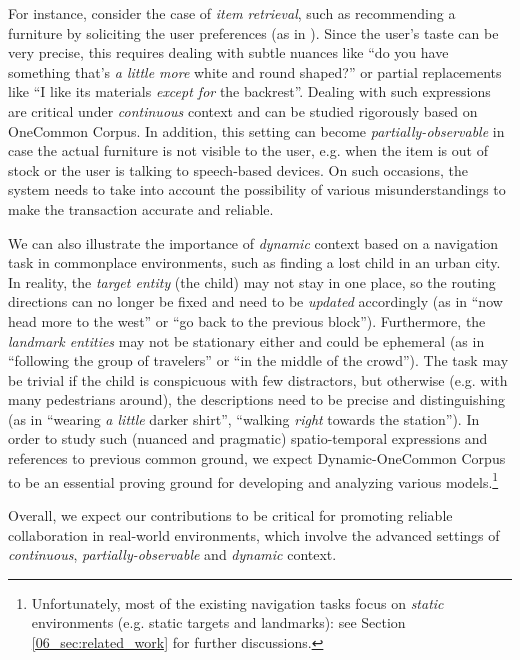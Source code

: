 For instance, consider the case of \textit{item retrieval}, such as recommending a furniture by soliciting the user preferences (as in \citealp{moon-etal-2020-situated}). Since the user's taste can be very precise, this requires dealing with subtle nuances like ``do you have something that's \textit{a little more} white and round shaped?'' or partial replacements like ``I like its materials \textit{except for} the backrest''. Dealing with such expressions are critical under \textit{continuous} context and can be studied rigorously based on OneCommon Corpus. In addition, this setting can become \textit{partially-observable} in case the actual furniture is not visible to the user, e.g. when the item is out of stock or the user is talking to speech-based devices. On such occasions, the system needs to take into account the possibility of various misunderstandings to make the transaction accurate and reliable.

We can also illustrate the importance of \textit{dynamic} context based on a navigation task in commonplace environments, such as finding a lost child in an urban city. In reality, the \textit{target entity} (the child) may not stay in one place, so the routing directions can no longer be fixed and need to be \textit{updated} accordingly (as in ``now head more to the west'' or ``go back to the previous block''). Furthermore, the \textit{landmark entities} may not be stationary either and could be ephemeral (as in ``following the group of travelers'' or ``in the middle of the crowd''). The task may be trivial if the child is conspicuous with few distractors, but otherwise (e.g. with many pedestrians around), the descriptions need to be precise and distinguishing (as in ``wearing \textit{a little} darker shirt'', ``walking \textit{right} towards the station''). In order to study such (nuanced and pragmatic) spatio-temporal expressions and references to previous common ground, we expect Dynamic-OneCommon Corpus to be an essential proving ground for developing and analyzing various models.\footnote{Unfortunately, most of the existing navigation tasks focus on \textit{static} environments (e.g. static targets and landmarks): see Section \ref{06_sec:related_work} for further discussions.}

Overall, we expect our contributions to be critical for promoting reliable collaboration in real-world environments, which involve the advanced settings of \textit{continuous}, \textit{partially-observable} and \textit{dynamic} context.




